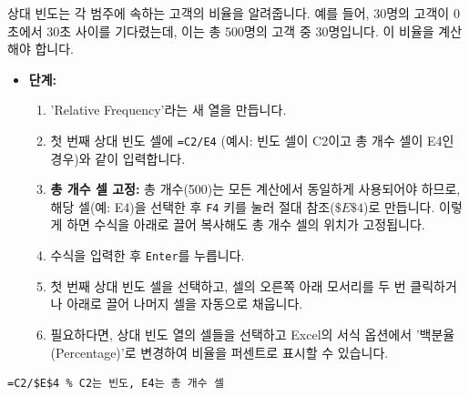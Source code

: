 \documentclass[11pt,a4paper]{book}
\theoremstyle{definition}
\begin{document}
\begin{tcolorbox}[title={상대 빈도 계산 (Calculating Relative Frequency)}]
상대 빈도는 각 범주에 속하는 고객의 비율을 알려줍니다. 예를 들어, 30명의 고객이 0초에서 30초 사이를 기다렸는데, 이는 총 500명의 고객 중 30명입니다. 이 비율을 계산해야 합니다.

\begin{itemize}
    \item \textbf{단계:}
    \begin{enumerate}
        \item 'Relative Frequency'라는 새 열을 만듭니다.
        \item 첫 번째 상대 빈도 셀에 \texttt{=C2/E4} (예시: 빈도 셀이 C2이고 총 개수 셀이 E4인 경우)와 같이 입력합니다.
        \item \textbf{총 개수 셀 고정:} 총 개수(500)는 모든 계산에서 동일하게 사용되어야 하므로, 해당 셀(예: E4)을 선택한 후 \texttt{F4} 키를 눌러 절대 참조($\$E\$4$)로 만듭니다. 이렇게 하면 수식을 아래로 끌어 복사해도 총 개수 셀의 위치가 고정됩니다.
        \item 수식을 입력한 후 \texttt{Enter}를 누릅니다.
        \item 첫 번째 상대 빈도 셀을 선택하고, 셀의 오른쪽 아래 모서리를 두 번 클릭하거나 아래로 끌어 나머지 셀을 자동으로 채웁니다.
        \item 필요하다면, 상대 빈도 열의 셀들을 선택하고 Excel의 서식 옵션에서 '백분율 (Percentage)'로 변경하여 비율을 퍼센트로 표시할 수 있습니다.
    \end{enumerate}
\end{itemize}

\begin{lstlisting}[caption={Excel 상대 빈도 계산 예시}, label={lst:excel_relative_frequency}]
=C2/$E$4 % C2는 빈도, E4는 총 개수 셀
\end{lstlisting}


\end{tcolorbox}
\end{document}

